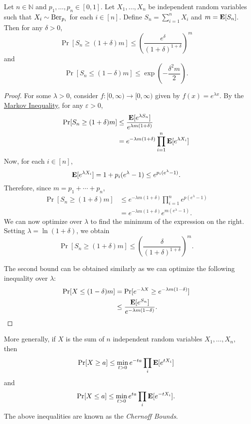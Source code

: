 \begin{corollary}
    Let $n\in\mathbb{N}$ and $p_1,\ldots,p_n\in[0,1]$. Let $X_1,\ldots,X_n$ be independent random variables such that $X_i\sim\operatorname{Ber}_{p_i}$ for each $i\in[n]$. Define $S_n=\sum_{i=1}^n X_i$ and $m=\textbf{E}[S_n]$. Then for any $\delta>0$,
    $$\Pr\left[S_n\geq(1+\delta)m\right]\leq \left(\frac{e^\delta}{(1+\delta)^{1+\delta}}\right)^m$$
    and
    $$\Pr\left[S_n\leq(1-\delta)m\right]\leq \exp\left(-\frac{\delta^2m}{2}\right).$$
\end{corollary}
\begin{proof}
    For some $\lambda>0$, consider $f:[0,\infty)\to[0,\infty)$ given by $f(x)=e^{\lambda x}$. By the \hyperref[markov inequality]{Markov Inequality}, for any $\varepsilon>0$,
    \begin{align*}
        \Pr[S_n\geq (1+\delta)m] &\leq \frac{\textbf{E}[e^{\lambda S_n}]}{e^{\lambda m(1+\delta)}} \\
        &= e^{-\lambda m(1+\delta)}\prod_{i=1}^n \textbf{E}[e^{\lambda X_i}]
    \end{align*}
    Now, for each $i\in[n]$,
    $$\textbf{E}[e^{\lambda X_i}] = 1+p_i(e^\lambda-1)\leq e^{p_i(e^{\lambda}-1)}.$$
    Therefore, since $m=p_1+\cdots+p_n$,
    \begin{align*}
        \Pr[S_n\geq (1+\delta)m] &\leq e^{-\lambda m(1+\delta)}\prod_{i=1}^n e^{p(e^\lambda - 1)} \\
        &= e^{-\lambda m(1+\delta)} e^{m(e^\lambda - 1)}.
    \end{align*}
    We can now optimize over $\lambda$ to find the minimum of the expression on the right. Setting $\lambda=\ln(1+\delta)$, we obtain
    $$\Pr[S_n\geq (1+\delta)m]\leq \left(\frac{\delta}{(1+\delta)^{1+\delta}}\right)^m.$$
    
    The second bound can be obtained similarly as we can optimize the following inequality over $\lambda$:
    \begin{align*}
        \Pr[X\leq (1-\delta)m] &= \Pr[e^{-\lambda X}\geq e^{-\lambda m(1-\delta)}] \\
        &\leq \frac{\textbf{E}[e^{S_n}]}{e^{-\lambda m(1-\delta)}}.
    \end{align*}
\end{proof}

More generally, if $X$ is the sum of $n$ independent random variables $X_1,\ldots,X_n$, then
$$\Pr[X\geq a]\leq \min_{t>0} e^{-ta}\prod_i\textbf{E}[e^{tX_i}]$$
and
$$\Pr[X\leq a]\leq \min_{t>0} e^{ta}\prod_i\textbf{E}[e^{-tX_i}].$$
The above inequalities are known as the \textit{Chernoff Bounds}.

